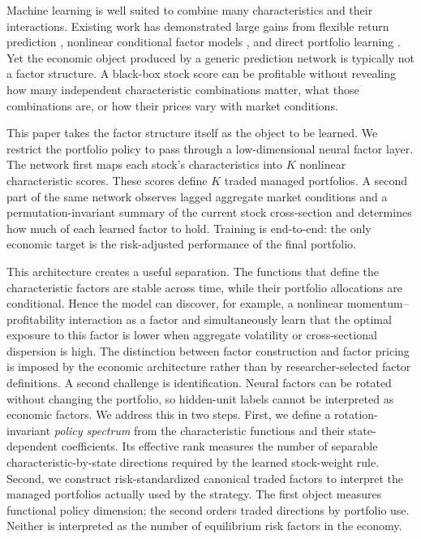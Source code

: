 \documentclass[12pt]{article}
\begin{document}
Machine learning is well suited to combine many characteristics and their interactions. Existing work has demonstrated large gains from flexible return prediction \citep{gu2020empirical}, nonlinear conditional factor models \citep{gu2021autoencoder,chen2024deep}, and direct portfolio learning \citep{jensen2026implementable}. Yet the economic object produced by a generic prediction network is typically not a factor structure. A black-box stock score can be profitable without revealing how many independent characteristic combinations matter, what those combinations are, or how their prices vary with market conditions.

This paper takes the factor structure itself as the object to be learned. We restrict the portfolio policy to pass through a low-dimensional neural factor layer. The network first maps each stock's characteristics into $K$ nonlinear characteristic scores. These scores define $K$ traded managed portfolios. A second part of the same network observes lagged aggregate market conditions and a permutation-invariant summary of the current stock cross-section and determines how much of each learned factor to hold. Training is end-to-end: the only economic target is the risk-adjusted performance of the final portfolio.

This architecture creates a useful separation. The functions that define the characteristic factors are stable across time, while their portfolio allocations are conditional. Hence the model can discover, for example, a nonlinear momentum--profitability interaction as a factor and simultaneously learn that the optimal exposure to this factor is lower when aggregate volatility or cross-sectional dispersion is high. The distinction between factor construction and factor pricing is imposed by the economic architecture rather than by researcher-selected factor definitions.
A second challenge is identification. Neural factors can be rotated without changing the portfolio, so hidden-unit labels cannot be interpreted as economic factors. We address this in two steps. First, we define a rotation-invariant \emph{policy spectrum} from the characteristic functions and their state-dependent coefficients. Its effective rank measures the number of separable characteristic-by-state directions required by the learned stock-weight rule. Second, we construct risk-standardized canonical traded factors to interpret the managed portfolios actually used by the strategy. The first object measures functional policy dimension; the second orders traded directions by portfolio use. Neither is interpreted as the number of equilibrium risk factors in the economy.
\end{document}
